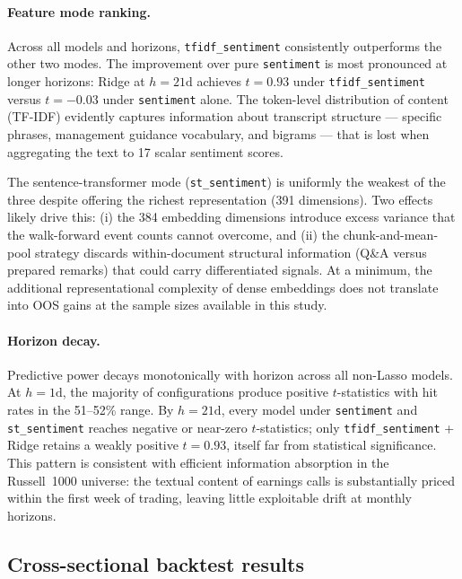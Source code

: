 \documentclass{article}
\begin{document}
\paragraph{Feature mode ranking.}
Across all models and horizons, \texttt{tfidf\_sentiment} consistently outperforms the other two modes. The improvement over pure \texttt{sentiment} is most pronounced at longer horizons: Ridge at $h=21\text{d}$ achieves $t=0.93$ under \texttt{tfidf\_sentiment} versus $t=-0.03$ under \texttt{sentiment} alone. The token-level distribution of content (TF-IDF) evidently captures information about transcript structure — specific phrases, management guidance vocabulary, and bigrams — that is lost when aggregating the text to 17 scalar sentiment scores.

The sentence-transformer mode (\texttt{st\_sentiment}) is uniformly the weakest of the three despite offering the richest representation (391 dimensions). Two effects likely drive this: (i) the 384 embedding dimensions introduce excess variance that the walk-forward event counts cannot overcome, and (ii) the chunk-and-mean-pool strategy discards within-document structural information (Q\&A versus prepared remarks) that could carry differentiated signals. At a minimum, the additional representational complexity of dense embeddings does not translate into OOS gains at the sample sizes available in this study.

\paragraph{Horizon decay.}
Predictive power decays monotonically with horizon across all non-Lasso models. At $h=1\text{d}$, the majority of configurations produce positive $t$-statistics with hit rates in the 51--52\% range. By $h=21\text{d}$, every model under \texttt{sentiment} and \texttt{st\_sentiment} reaches negative or near-zero $t$-statistics; only \texttt{tfidf\_sentiment} + Ridge retains a weakly positive $t=0.93$, itself far from statistical significance. This pattern is consistent with efficient information absorption in the Russell~1000 universe: the textual content of earnings calls is substantially priced within the first week of trading, leaving little exploitable drift at monthly horizons.

\subsection{Cross-sectional backtest results}
\label{sec:backtest}
\end{document}
